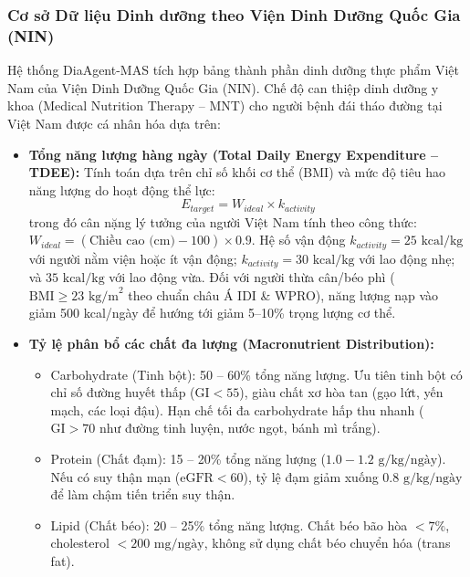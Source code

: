 \documentclass[12pt,a4paper]{article}
\begin{document}
\subsubsection{Cơ sở Dữ liệu Dinh dưỡng theo Viện Dinh Dưỡng Quốc Gia (NIN)}
Hệ thống DiaAgent-MAS tích hợp bảng thành phần dinh dưỡng thực phẩm Việt Nam của Viện Dinh Dưỡng Quốc Gia (NIN). Chế độ can thiệp dinh dưỡng y khoa (Medical Nutrition Therapy -- MNT) cho người bệnh đái tháo đường tại Việt Nam được cá nhân hóa dựa trên:
\begin{itemize}[leftmargin=1.2cm]
    \item \textbf{Tổng năng lượng hàng ngày (Total Daily Energy Expenditure -- TDEE):}
    Tính toán dựa trên chỉ số khối cơ thể (BMI) và mức độ tiêu hao năng lượng do hoạt động thể lực:
    \begin{equation}
        E_{target} = W_{ideal} \times k_{activity}
    \end{equation}
    trong đó cân nặng lý tưởng của người Việt Nam tính theo công thức: $W_{ideal} = (\text{Chiều cao (cm)} - 100) \times 0.9$. Hệ số vận động $k_{activity} = 25\text{ kcal/kg}$ với người nằm viện hoặc ít vận động; $k_{activity} = 30\text{ kcal/kg}$ với lao động nhẹ; và $35\text{ kcal/kg}$ với lao động vừa. Đối với người thừa cân/béo phì ($\text{BMI} \ge 23\text{ kg/m}^2$ theo chuẩn châu Á IDI \& WPRO), năng lượng nạp vào giảm 500 kcal/ngày để hướng tới giảm 5--10\% trọng lượng cơ thể.
    \item \textbf{Tỷ lệ phân bổ các chất đa lượng (Macronutrient Distribution):}
    \begin{itemize}[leftmargin=0.8cm]
        \item Carbohydrate (Tinh bột): 50 -- 60\% tổng năng lượng. Ưu tiên tinh bột có chỉ số đường huyết thấp ($\text{GI} < 55$), giàu chất xơ hòa tan (gạo lứt, yến mạch, các loại đậu). Hạn chế tối đa carbohydrate hấp thu nhanh ($\text{GI} > 70$ như đường tinh luyện, nước ngọt, bánh mì trắng).
        \item Protein (Chất đạm): 15 -- 20\% tổng năng lượng ($1.0 - 1.2\text{ g/kg/ngày}$). Nếu có suy thận mạn ($\text{eGFR} < 60$), tỷ lệ đạm giảm xuống $0.8\text{ g/kg/ngày}$ để làm chậm tiến triển suy thận.
        \item Lipid (Chất béo): 20 -- 25\% tổng năng lượng. Chất béo bão hòa $< 7\%$, cholesterol $< 200\text{ mg/ngày}$, không sử dụng chất béo chuyển hóa (trans fat).
    \end{itemize}
\end{itemize}
\end{document}
